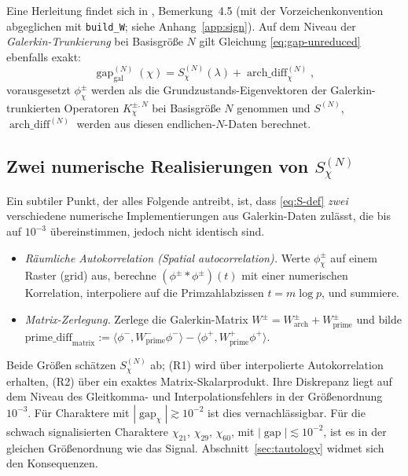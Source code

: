 \documentclass[a4paper,10pt,twocolumn]{article}
\theoremstyle{definition}
\theoremstyle{remark}
\newcommand{\gap}{\operatorname{gap}}
\newcommand{\chifn}{\chi}
\newcommand{\archdiff}{\operatorname{arch\_diff}}
\begin{document}
Eine Herleitung findet sich in \cite{AnalyticKernel}, Bemerkung~4.5 (mit
der Vorzeichenkonvention abgeglichen mit \texttt{build\_W}; siehe
Anhang~\ref{app:sign}). Auf dem Niveau der \emph{Galerkin-Trunkierung}
bei Basisgröße $N$ gilt Gleichung
\eqref{eq:gap-unreduced} ebenfalls exakt:
\begin{equation}
\label{eq:gap-galerkin}
  \gap_{\mathrm{gal}}^{(N)}(\chifn)
    = S_{\chifn}^{(N)}(\lambda) + \archdiff_{\chifn}^{(N)},
\end{equation}
vorausgesetzt $\phi^\pm_{\chifn}$ werden als die Grundzustands-Eigenvektoren
der Galerkin-trunkierten Operatoren $K_{\chifn}^{\pm, N}$
bei Basisgröße $N$ genommen und $S^{(N)}$, $\archdiff^{(N)}$ werden
aus diesen endlichen-$N$-Daten berechnet.

\subsection{Zwei numerische Realisierungen von \texorpdfstring{$S_{\chifn}^{(N)}$}{S}}
\label{sec:formula-two-realizations}

Ein subtiler Punkt, der alles Folgende antreibt, ist, dass
\eqref{eq:S-def} \emph{zwei} verschiedene numerische
Implementierungen aus Galerkin-Daten zulässt, die bis auf $10^{-3}$ übereinstimmen,
jedoch nicht identisch sind.
\begin{itemize}
  \item[(R1)] \emph{Räumliche Autokorrelation (Spatial autocorrelation).} Werte
    $\phi_{\chifn}^\pm$ auf einem Raster (grid) aus, berechne $(\phi^\pm
    *\phi^\pm)(t)$ mit einer numerischen Korrelation, interpoliere auf
    die Primzahlabzissen $t=m\log p$, und summiere.
  \item[(R2)] \emph{Matrix-Zerlegung.} Zerlege die Galerkin-Matrix
    $W^\pm=W^\pm_{\mathrm{arch}}+W^\pm_{\mathrm{prime}}$ und
    bilde
    $\mathrm{prime\_diff}_{\mathrm{matrix}}
      :=\langle\phi^-,W^-_{\mathrm{prime}}\phi^-\rangle
      -\langle\phi^+,W^+_{\mathrm{prime}}\phi^+\rangle$.
\end{itemize}
Beide Größen schätzen $S_{\chifn}^{(N)}$ ab; (R1) wird über
interpolierte Autokorrelation erhalten, (R2) über ein exaktes Matrix-Skalarprodukt.
Ihre Diskrepanz liegt auf dem Niveau des Gleitkomma- und
Interpolationsfehlers in der Größenordnung $10^{-3}$. Für Charaktere mit
$|\gap_{\chifn}|\gtrsim 10^{-2}$ ist dies vernachlässigbar. Für die schwach
signalisierten Charaktere $\chifn_{21}$, $\chifn_{29}$, $\chifn_{60}$,
mit $|\gap|\lesssim 10^{-2}$, ist es in der gleichen Größenordnung wie das
Signal. Abschnitt~\ref{sec:tautology} widmet sich den Konsequenzen.
\end{document}
